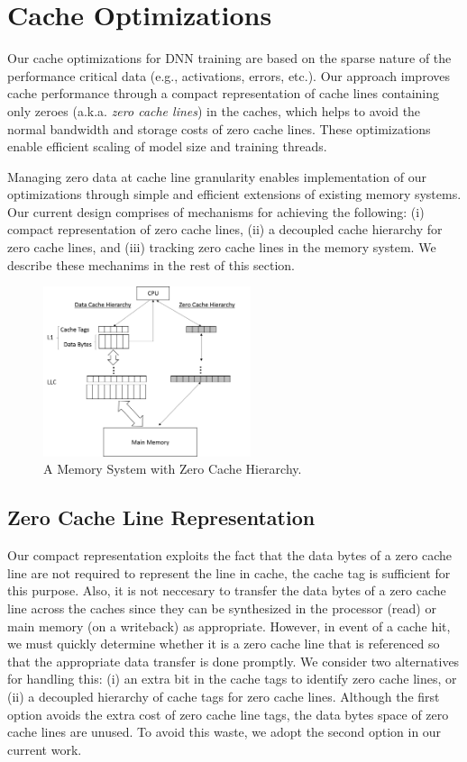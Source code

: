\section{Cache Optimizations}
\label{sec:cache_opt}

Our cache optimizations for DNN training are based on the sparse nature of the performance critical data (e.g., activations, errors, etc.).  Our approach improves cache performance through a compact representation of cache lines containing only zeroes (a.k.a. \emph{zero cache lines}) in the caches, which helps to avoid  the normal bandwidth and storage costs of zero cache lines. These optimizations enable efficient scaling of model size and training threads.  

Managing zero data at cache line granularity enables implementation of our optimizations through simple and efficient extensions of existing memory systems.  Our current design comprises of mechanisms for achieving the following: (i) compact representation of zero cache lines, (ii) a decoupled cache hierarchy for zero cache lines, and (iii) tracking zero cache lines in the memory system.  We describe these mechanims in the rest of this section.

\begin{figure}[!t]
\centering
\includegraphics[width=2.4in]{Figures/zero_cache_hierarchy.png}
\caption{A Memory System with Zero Cache Hierarchy.}
\label{fig:zero_cache_hierarchy}
\end{figure}

\subsection{Zero Cache Line Representation}

Our compact representation exploits the fact that the data bytes of a zero cache line are not required to represent the line in cache, the cache tag is sufficient for this purpose. Also, it is not neccesary to transfer the data bytes of a zero cache line across the caches since they can be synthesized in the processor (read) or main memory (on a writeback) as appropriate.  However, in event of a cache hit, we must quickly determine whether it is a zero cache line that is referenced so that the appropriate data transfer is done promptly. We consider two alternatives for handling this: (i) an extra bit in the cache tags to identify zero cache lines, or (ii) a decoupled hierarchy of cache tags for zero cache lines.  Although the first option avoids the extra cost of zero cache line tags, the data bytes space of zero cache lines are unused.  To avoid this waste, we adopt the second option in our current work. 

